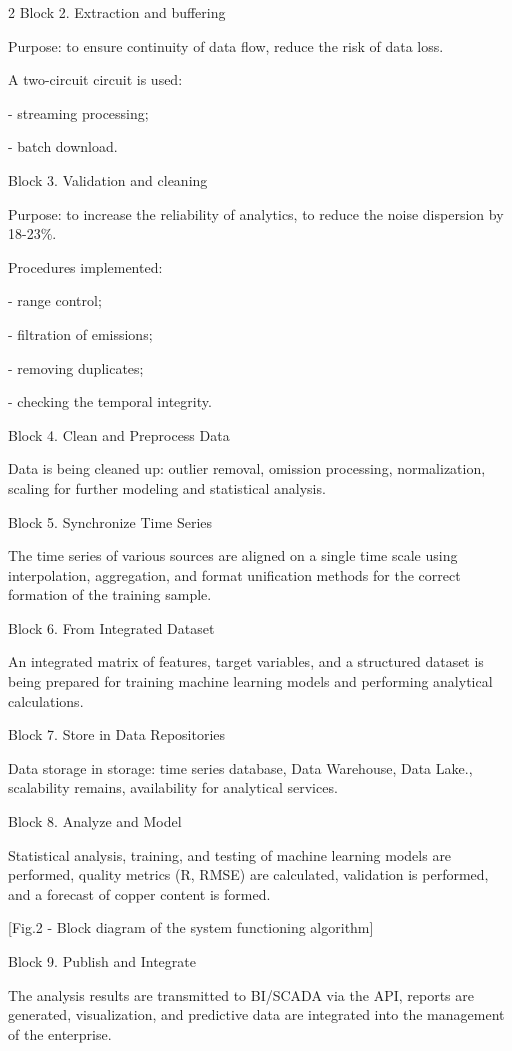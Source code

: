 \begin{multicols}{2}
Block 2. Extraction and buffering

Purpose: to ensure continuity of data flow, reduce the risk of data
loss.

A two-circuit circuit is used:

- streaming processing;

- batch download.

Block 3. Validation and cleaning

Purpose: to increase the reliability of analytics, to reduce the noise
dispersion by 18-23\%.

Procedures implemented:

- range control;

- filtration of emissions;

- removing duplicates;

- checking the temporal integrity.

Block 4. Clean and Preprocess Data

Data is being cleaned up: outlier removal, omission processing,
normalization, scaling for further modeling and statistical analysis.

Block 5. Synchronize Time Series

The time series of various sources are aligned on a single time scale
using interpolation, aggregation, and format unification methods for the
correct formation of the training sample.

Block 6. From Integrated Dataset

An integrated matrix of features, target variables, and a structured
dataset is being prepared for training machine learning models and
performing analytical calculations.

Block 7. Store in Data Repositories

Data storage in storage: time series database, Data Warehouse, Data
Lake., scalability remains, availability for analytical services.

Block 8. Analyze and Model

Statistical analysis, training, and testing of machine learning models
are performed, quality metrics (R, RMSE) are
calculated, validation is performed, and a forecast of copper content is
formed.

[Fig.2 - Block diagram of the system functioning algorithm]

Block 9. Publish and Integrate

The analysis results are transmitted to BI/SCADA via the API, reports
are generated, visualization, and predictive data are integrated into
the management of the enterprise.


\end{multicols}
